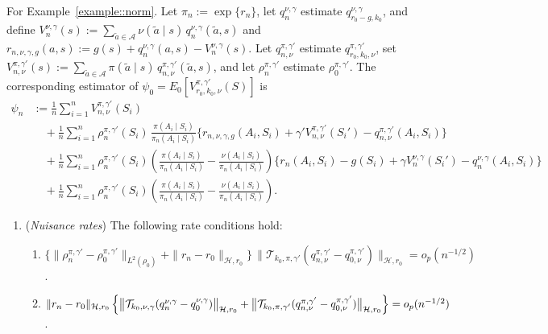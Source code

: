 \documentclass[12pt]{article}
\theoremstyle{plain}
\begin{document}
For Example~\ref{example::norm}. Let \(\pi_n:=\exp\{r_n\}\), let
\(q_n^{\nu,\gamma}\) estimate \(q_{r_0-g,k_0}^{\nu,\gamma}\), and define
\(V_n^{\nu,\gamma}(s):=\sum_{\tilde a\in\mathcal A}\nu(\tilde a\mid s)\,
q_n^{\nu,\gamma}(\tilde a,s)\) and
\(r_{n,\nu,\gamma,g}(a,s):=g(s)+q_n^{\nu,\gamma}(a,s)-V_n^{\nu,\gamma}(s)\).
Let \(q_{n,\nu}^{\pi,\gamma'}\) estimate
\(q_{r_0,k_0,\nu}^{\pi,\gamma'}\), set
\(V_{n,\nu}^{\pi,\gamma'}(s):=\sum_{\tilde a\in\mathcal A}\pi(\tilde a\mid s)\,
q_{n,\nu}^{\pi,\gamma'}(\tilde a,s)\), and let \(\rho_n^{\pi,\gamma'}\)
estimate \(\rho_0^{\pi,\gamma'}\). The corresponding estimator of
\(\psi_0=E_0[V_{r_0,k_0,\nu}^{\pi,\gamma'}(S)]\) is
\begin{align*}
\psi_n
&:= \frac{1}{n}\sum_{i=1}^n V_{n,\nu}^{\pi,\gamma'}(S_i) \\
&\quad + \frac{1}{n}\sum_{i=1}^n \rho_n^{\pi,\gamma'}(S_i)\,
        \frac{\pi(A_i \mid S_i)}{\pi_n(A_i \mid S_i)}
        \bigl\{r_{n,\nu,\gamma,g}(A_i,S_i)
        + \gamma' V_{n,\nu}^{\pi,\gamma'}(S_i')
        - q_{n,\nu}^{\pi,\gamma'}(A_i,S_i)\bigr\} \\
&\quad + \frac{1}{n}\sum_{i=1}^n \rho_n^{\pi,\gamma'}(S_i)
        \left(
            \frac{\pi(A_i \mid S_i)}{\pi_n(A_i \mid S_i)}
            -
            \frac{\nu(A_i \mid S_i)}{\pi_n(A_i \mid S_i)}
        \right)
        \bigl\{r_n(A_i,S_i) - g(S_i)
        + \gamma V_n^{\nu,\gamma}(S_i')
        - q_n^{\nu,\gamma}(A_i,S_i)\bigr\} \\
&\quad + \frac{1}{n}\sum_{i=1}^n \rho_n^{\pi,\gamma'}(S_i)
        \left(
            \frac{\pi(A_i \mid S_i)}{\pi_n(A_i \mid S_i)}
            -
            \frac{\nu(A_i \mid S_i)}{\pi_n(A_i \mid S_i)}
        \right).
\end{align*}
 

 


 

\begin{enumerate}[label=\textbf{(E\arabic***)}, ref=E\arabic***, series=efficiency2]
    \item \label{assump:rates::policynorm} (\textit{Nuisance rates})
    The following rate conditions hold:
    \begin{enumerate}[label=(\alph*)]
        \item
        \(\bigl\{\|\rho_n^{\pi,\gamma'}-\rho_0^{\pi,\gamma'}\|_{L^2(\rho_0)}
        +\|r_n-r_0\|_{\mathcal{H},r_0}\bigr\}\,
        \bigl\|\mathcal{T}_{k_0,\pi,\gamma'}
        (q_{n,\nu}^{\pi,\gamma'}-q_{0,\nu}^{\pi,\gamma'})\bigr\|_{\mathcal{H},r_0}
        =o_p(n^{-1/2})\).
        \item
        \(\|r_n-r_0\|_{\mathcal{H},r_0}\,
        \Bigl\{
        \bigl\|\mathcal{T}_{k_0,\nu,\gamma}(q_n^{\nu,\gamma}-q_0^{\nu,\gamma})\bigr\|_{\mathcal{H},r_0}
        +\bigl\|\mathcal{T}_{k_0,\pi,\gamma'}
        (q_{n,\nu}^{\pi,\gamma'}-q_{0,\nu}^{\pi,\gamma'})\bigr\|_{\mathcal{H},r_0}
        \Bigr\}
        =o_p(n^{-1/2})\).
    \end{enumerate}
\end{enumerate}
\end{document}
